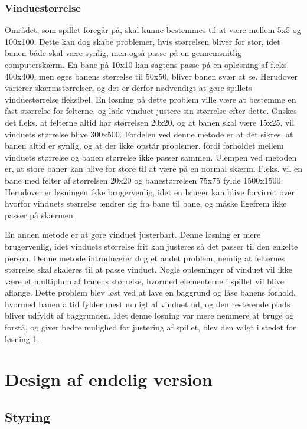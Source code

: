 \documentclass{report}
\begin{document}
\subsubsection{Vinduestørrelse}
Området, som spillet foregår på, skal kunne bestemmes til at være mellem 5x5 og 100x100. Dette kan dog skabe problemer, hvis størrelsen bliver for stor, idet banen både skal være synlig, men også passe på en gennemsnitlig computerskærm. En bane på 10x10 kan sagtens passe på en opløsning af f.eks. 400x400, men øges banens størrelse til 50x50, bliver banen svær at se. Herudover varierer skærmstørrelser, og det er derfor nødvendigt at gøre spillets vinduestørrelse fleksibel. En løsning på dette problem ville være at bestemme en fast størrelse for felterne, og lade vinduet justere sin størrelse efter dette. Ønskes det f.eks. at felterne altid har størrelsen 20x20, og at banen skal være 15x25, vil vinduets størrelse blive 300x500. Fordelen ved denne metode er at det sikres, at banen altid er synlig, og at der ikke opstår problemer, fordi forholdet mellem vinduets størrelse og banen størrelse ikke passer sammen. Ulempen ved metoden er, at store baner kan blive for store til at være på en normal skærm. F.eks. vil en bane med felter af størrelsen 20x20 og banestørrelsen 75x75 fylde 1500x1500. Herudover er løsningen ikke brugervenlig, idet en bruger kan blive forvirret over hvorfor vinduets størrelse ændrer sig fra bane til bane, og måske ligefrem ikke passer på skærmen.

En anden metode er at gøre vinduet justerbart. Denne løsning er mere brugervenlig, idet vinduets størrelse frit kan justeres så det passer til den enkelte person. Denne metode introducerer dog et andet problem, nemlig at felternes størrelse skal skaleres til at passe vinduet. Nogle opløsninger af vinduet vil ikke være et multiplum af banens størrelse, hvormed elementerne i spillet vil blive aflange. Dette problem blev løst ved at lave en baggrund og låse banens forhold, hvormed banen altid fylder mest muligt af vinduet ud, og den resterende plads bliver udfyldt af baggrunden. Idet denne løsning var mere nemmere at bruge og forstå, og giver bedre mulighed for justering af spillet, blev den valgt i stedet for løsning 1.
\section{Design af endelig version}

\subsection{Styring}
\end{document}
